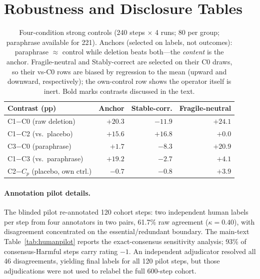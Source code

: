 \documentclass[11pt]{article}
\begin{document}
\section{Robustness and Disclosure Tables}
\label{app:robust}

\begin{table}[h]
\centering
\scriptsize
\setlength{\tabcolsep}{2.6pt}
\begin{tabular}{@{}lrrr@{}}
\toprule
Contrast (pp) & Anchor & Stable-corr. & Fragile-neutral \\
\midrule
C1$-$C0 (raw deletion)      & $+20.3$ & $-11.9$ & $+24.1$ \\
C1$-$C2 (vs.\ placebo)      & $+15.6$ & $+16.8$ & $\mathbf{+0.0}$ \\
C3$-$C0 (paraphrase)        & $\mathbf{+1.7}$  & $-8.3$  & $+20.9$ \\
C1$-$C3 (vs.\ paraphrase)   & $\mathbf{+19.2}$ & $-2.7$  & $+4.1$ \\
C2$-$$C_p$ (placebo, own ctrl.) & $-0.7$ & $-0.8$ & $+3.9$ \\
\bottomrule
\end{tabular}
\caption{Four-condition strong controls (240 steps $\times$ 4 runs; 80 per group; paraphrase available for 221). Anchors (selected on labels, not outcomes): paraphrase $\approx$ control while deletion beats both---the \emph{content} is the anchor. Fragile-neutral and Stably-correct are selected on their C0 draws, so their vs-C0 rows are biased by regression to the mean (upward and downward, respectively); the own-control row shows the operator itself is inert. Bold marks contrasts discussed in the text.}
\label{tab:fourcond}
\end{table}

\paragraph{Annotation pilot details.} The blinded pilot re-annotated 120 cohort steps: two independent human labels per step from four annotators in two pairs, 61.7\% raw agreement ($\kappa = 0.40$), with disagreement concentrated on the essential/redundant boundary. The main-text Table~\ref{tab:humanpilot} reports the exact-consensus sensitivity analysis; 93\% of consensus-Harmful steps carry rating $-1$. An independent adjudicator resolved all 46 disagreements, yielding final labels for all 120 pilot steps, but those adjudications were not used to relabel the full 600-step cohort.
\end{document}
